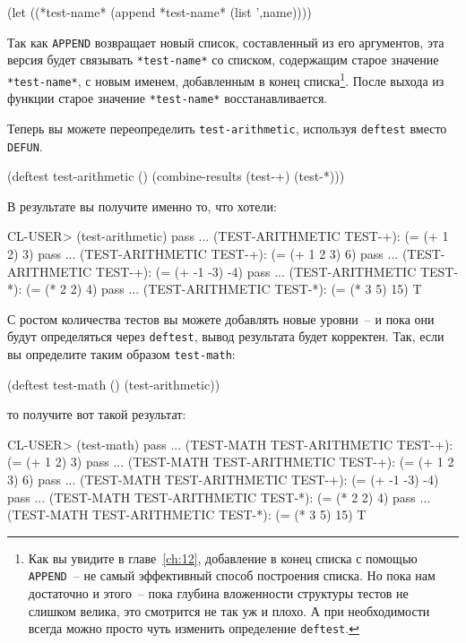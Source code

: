 \begin{myverb}
(let ((*test-name* (append *test-name* (list ',name))))
\end{myverb}

Так как \lstinline{APPEND} возвращает новый список, составленный из его аргументов, эта
версия будет связывать \lstinline{*test-name*} со списком, содержащим старое значение
\lstinline{*test-name*}, с новым именем, добавленным в конец списка\footnote{Как вы
  увидите в главе~\ref{ch:12}, добавление в конец списка с помощью \lstinline{APPEND}~--
  не самый эффективный способ построения списка. Но пока нам достаточно и этого~-- пока
  глубина вложенности структуры тестов не слишком велика, это смотрится не так уж и
  плохо. А при необходимости всегда можно просто чуть изменить определение
  \lstinline{deftest}.}. После выхода из функции старое значение \lstinline{*test-name*}
восстанавливается.

Теперь вы можете переопределить \lstinline{test-arithmetic}, используя \lstinline{deftest} вместо
\lstinline{DEFUN}.

\begin{myverb}
(deftest test-arithmetic ()
  (combine-results
   (test-+)
   (test-*)))
\end{myverb}

В результате вы получите именно то, что хотели:

\begin{myverb}
CL-USER> (test-arithmetic)
pass ... (TEST-ARITHMETIC TEST-+): (= (+ 1 2) 3)
pass ... (TEST-ARITHMETIC TEST-+): (= (+ 1 2 3) 6)
pass ... (TEST-ARITHMETIC TEST-+): (= (+ -1 -3) -4)
pass ... (TEST-ARITHMETIC TEST-*): (= (* 2 2) 4)
pass ... (TEST-ARITHMETIC TEST-*): (= (* 3 5) 15)
T
\end{myverb}

С ростом количества тестов вы можете добавлять новые уровни~-- и пока они будут
определяться через \lstinline{deftest}, вывод результата будет корректен. Так, если вы
определите таким образом \lstinline{test-math}:

\begin{myverb}
(deftest test-math ()
  (test-arithmetic))
\end{myverb}

то получите вот такой результат:

\begin{myverb}
CL-USER> (test-math)
pass ... (TEST-MATH TEST-ARITHMETIC TEST-+): (= (+ 1 2) 3)
pass ... (TEST-MATH TEST-ARITHMETIC TEST-+): (= (+ 1 2 3) 6)
pass ... (TEST-MATH TEST-ARITHMETIC TEST-+): (= (+ -1 -3) -4)
pass ... (TEST-MATH TEST-ARITHMETIC TEST-*): (= (* 2 2) 4)
pass ... (TEST-MATH TEST-ARITHMETIC TEST-*): (= (* 3 5) 15)
T
\end{myverb}

